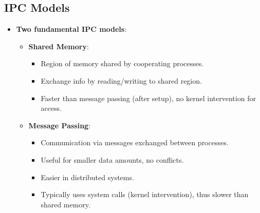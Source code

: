 \subsection{IPC Models}
\begin{itemize}
    \item \textbf{Two fundamental IPC models}:
        \begin{itemize}
            \item \textbf{Shared Memory}:
                \begin{itemize}
                    \item Region of memory shared by cooperating processes.
                    \item Exchange info by reading/writing to shared region.
                    \item Faster than message passing (after setup), no kernel intervention for access.
                \end{itemize}
            \item \textbf{Message Passing}:
                \begin{itemize}
                    \item Communication via messages exchanged between processes.
                    \item Useful for smaller data amounts, no conflicts.
                    \item Easier in distributed systems.
                    \item Typically uses system calls (kernel intervention), thus slower than shared memory.
                \end{itemize}
        \end{itemize}
\end{itemize}
